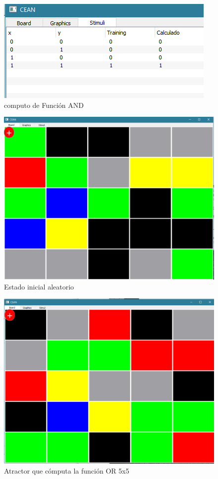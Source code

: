 \documentclass[]{article}
\begin{document}
\begin{figure}
\centering
\includegraphics[width=0.7\linewidth]{or_salida}
\caption{computo de Función AND}
\label{fig:or_salida}
\end{figure}




\begin{figure}
\centering
\includegraphics[width=0.7\linewidth]{ore_2}
\caption{Estado inicial aleatorio}
\label{fig:ore_2}
\end{figure}

\begin{figure}
\centering
\includegraphics[width=0.7\linewidth]{ore}
\caption{Atractor que cómputa la función OR 5x5}
\label{fig:ore}
\end{figure}
\end{document}
